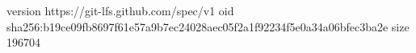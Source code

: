 version https://git-lfs.github.com/spec/v1
oid sha256:b19ce09fb8697f61e57a9b7ec24028aec05f2a1f92234f5e0a34a06bfec3ba2e
size 196704
